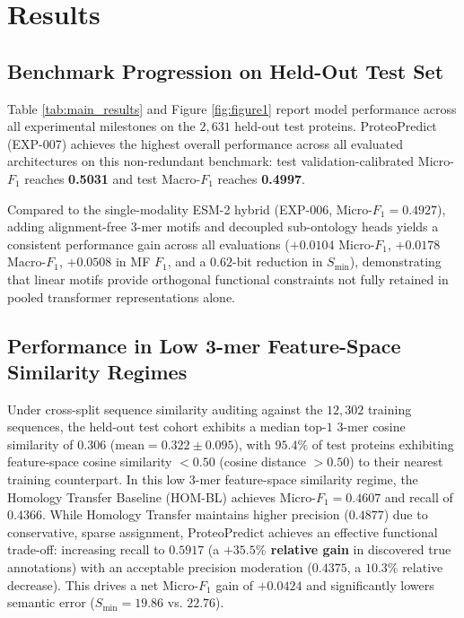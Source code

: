 \documentclass[journal]{IEEEtran}
\begin{document}
\section{Results}

\subsection{Benchmark Progression on Held-Out Test Set}
Table \ref{tab:main_results} and Figure \ref{fig:figure1} report model performance across all experimental milestones on the $2,631$ held-out test proteins. ProteoPredict (EXP-007) achieves the highest overall performance across all evaluated architectures on this non-redundant benchmark: test validation-calibrated Micro-$F_1$ reaches \textbf{0.5031} and test Macro-$F_1$ reaches \textbf{0.4997}.

Compared to the single-modality ESM-2 hybrid (EXP-006, Micro-$F_1 = 0.4927$), adding alignment-free $3$-mer motifs and decoupled sub-ontology heads yields a consistent performance gain across all evaluations ($+0.0104$ Micro-$F_1$, $+0.0178$ Macro-$F_1$, $+0.0508$ in MF $F_1$, and a $0.62$-bit reduction in $S_{\min}$), demonstrating that linear motifs provide orthogonal functional constraints not fully retained in pooled transformer representations alone.

\subsection{Performance in Low 3-mer Feature-Space Similarity Regimes}
Under cross-split sequence similarity auditing against the $12,302$ training sequences, the held-out test cohort exhibits a median top-$1$ $3$-mer cosine similarity of $0.306$ ($\text{mean} = 0.322 \pm 0.095$), with $95.4\%$ of test proteins exhibiting feature-space cosine similarity $< 0.50$ (cosine distance $> 0.50$) to their nearest training counterpart. In this low $3$-mer feature-space similarity regime, the Homology Transfer Baseline (HOM-BL) achieves Micro-$F_1 = 0.4607$ and recall of $0.4366$. While Homology Transfer maintains higher precision ($0.4877$) due to conservative, sparse assignment, ProteoPredict achieves an effective functional trade-off: increasing recall to \textbf{$0.5917$} (a \textbf{$+35.5\%$ relative gain} in discovered true annotations) with an acceptable precision moderation ($0.4375$, a $10.3\%$ relative decrease). This drives a net Micro-$F_1$ gain of \textbf{$+0.0424$} and significantly lowers semantic error ($S_{\min} = 19.86$ vs. $22.76$).
\end{document}
